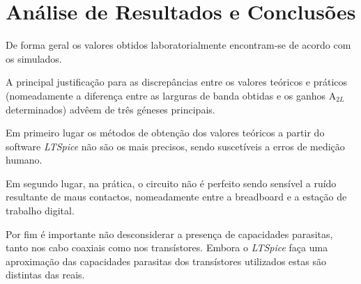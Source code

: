 \documentclass[a4paper,12pt]{article}
\begin{document}
		\section{Análise de Resultados e Conclusões}
			De forma geral os valores obtidos laboratorialmente encontram-se de acordo com os simulados.\par
			A principal justificação para as discrepâncias entre os valores teóricos e práticos (nomeadamente a diferença entre as larguras de banda obtidas e os ganhos A$_{2L}$ determinados) advêem de três géneses principais.\par
			Em primeiro lugar os métodos de obtenção dos valores teóricos a partir do software \textit{LTSpice} não são os mais precisos, sendo suscetíveis a erros de medição humano.\par
			Em segundo lugar, na prática, o circuito não é perfeito sendo sensível a ruído resultante de maus contactos, nomeadamente entre a breadboard e a estação de trabalho digital.\par
			Por fim é importante não desconsiderar a presença de capacidades parasitas, tanto nos cabo coaxiais como nos transístores. Embora o \textit{LTSpice} faça uma aproximação das capacidades parasitas dos transístores utilizados estas são distintas das reais.
\end{document}
